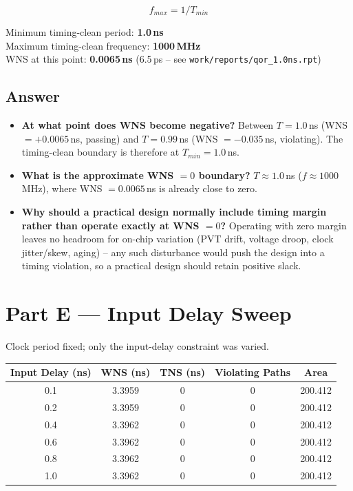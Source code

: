 \documentclass[11pt]{article}
\begin{document}
$$f_{max} = 1/T_{min}$$

Minimum timing-clean period: \textbf{1.0\,ns} \\
Maximum timing-clean frequency: \textbf{1000\,MHz} \\
WNS at this point: \textbf{0.0065\,ns} (6.5\,ps -- see \texttt{work/reports/qor\_1.0ns.rpt})

\subsection*{Answer}
\begin{itemize}
    \item \textbf{At what point does WNS become negative?} Between $T=1.0$\,ns (WNS $=+0.0065$\,ns,
    passing) and $T=0.99$\,ns (WNS $=-0.035$\,ns, violating). The timing-clean boundary is therefore
    at $T_{min}=1.0$\,ns.
    \item \textbf{What is the approximate WNS $=0$ boundary?} $T \approx 1.0$\,ns
    ($f\approx1000$\,MHz), where WNS $=0.0065$\,ns is already close to zero.
    \item \textbf{Why should a practical design normally include timing margin rather than operate
    exactly at WNS $=0$?} Operating with zero margin leaves no headroom for on-chip variation
    (PVT drift, voltage droop, clock jitter/skew, aging) -- any such disturbance would push the
    design into a timing violation, so a practical design should retain positive slack.
\end{itemize}

\section{Part E --- Input Delay Sweep}
Clock period fixed; only the input-delay constraint was varied.
\begin{center}
\begin{tabular}{|c|c|c|c|c|}
\hline
\textbf{Input Delay (ns)} & \textbf{WNS (ns)} & \textbf{TNS (ns)} & \textbf{Violating Paths} & \textbf{Area} \\ \hline
0.1 & 3.3959 & 0 & 0 & 200.412 \\ \hline
0.2 & 3.3959 & 0 & 0 & 200.412 \\ \hline
0.4 & 3.3962 & 0 & 0 & 200.412 \\ \hline
0.6 & 3.3962 & 0 & 0 & 200.412 \\ \hline
0.8 & 3.3962 & 0 & 0 & 200.412 \\ \hline
1.0 & 3.3962 & 0 & 0 & 200.412 \\ \hline
\end{tabular}
\end{center}
\end{document}
